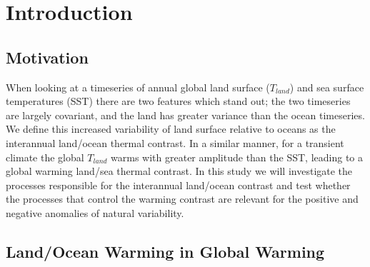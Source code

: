 \chapter{Introduction} %

\label{introduction} %



\section{Motivation}

When looking at a timeseries of annual global land surface ($T_{land}$) and sea 
surface temperatures (SST) there are two features which stand out; the two 
timeseries are largely covariant, and the land has greater variance than the 
ocean timeseries.  We define this increased variability of land surface relative 
to oceans as the interannual land/ocean thermal contrast. In a similar manner, 
for a transient climate the global $T_{land}$ warms with greater amplitude than 
the SST, leading to a global warming land/sea thermal contrast. In this study we 
will investigate the processes responsible for the interannual land/ocean 
contrast and test whether the processes that control the warming contrast are 
relevant for the positive and negative anomalies of natural variability.

\section{Land/Ocean Warming in Global Warming}\label{sec:logw}

